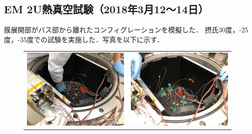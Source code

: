 \subsection{EM 2U熱真空試験（2018年3月12～14日）}

膜展開部がバス部から離れたコンフィグレーションを模擬した．
摂氏30度，-25度，-35度での試験を実施した．写真を以下に示す．
\begin{figure}[H]
	\centering
	\begin{tabular}{cc}
		\begin{minipage}{0.5\hsize}
			\begin{center}
				\includegraphics[width=1\textwidth]{04/fig/4-8-3-1.jpg}
			\end{center}
		\end{minipage}&
		\begin{minipage}{0.5\hsize}
			\begin{center}
				\includegraphics[width=1\textwidth]{04/fig/4-8-3-2.jpg}

\end{center}
\end{minipage}
\end{tabular}
\end{figure}
